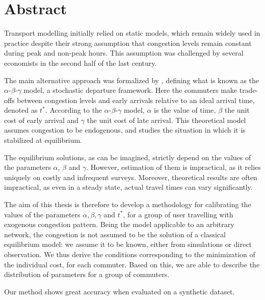 \section*{Abstract}

Transport modelling initially relied on static models, which remain widely used in practice despite their strong assumption that congestion levels remain constant during peak and non-peak hours.
This assumption was challenged by several economists
in the second half of the last century.

The main alternative approach was formalized by \textcite{de1983stochastic},
defining what is known as the \(\alpha\)-\(\beta\)-\(\gamma\) model,
a stochastic departure framework.
Here the commuters make trade-offs between congestion levels and early arrivals relative to an ideal arrival time, denoted as \(t^*\).
According to the \(\alpha\)-\(\beta\)-\(\gamma\) model,
\(\alpha\) is the value of time, \(\beta\) the unit cost of early arrival and \(\gamma\) the unit cost of late arrival.
This theoretical model assumes congestion to be endogenous,
and studies the situation in which it is stabilized at equilibrium.

The equilibrium solutions, as can be imagined,
strictly depend on the values of the parameters \(\alpha\), \(\beta\) and \(\gamma\).
However, estimation of them is impractical, as it relies uniquely on costly and infrequent surveys.
Moreover, theoretical results are often impractical, as even in a steady state, actual travel times can vary significantly.

The aim of this thesis is therefore to develop a methodology for calibrating the values of the parameters \(\alpha, \beta, \gamma\) and \(t^*\),
for a group of user travelling with exogenous congestion pattern.
Being the model applicable to an arbitrary network, the congestion is not assumed to be the solution of a classical equilibrium model:
we assume it to be known,
either from simulations or direct observation.
We thus derive the conditions corresponding to the minimization of the individual cost,
for each commuter.
Based on this, we are able to describe the distribution of parameters for a group of commuters.

Our method shows great accuracy when evaluated on a synthetic dataset.



